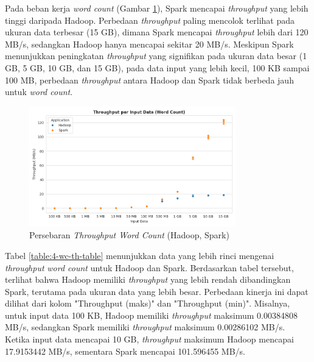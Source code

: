 \newpage
Pada beban kerja \textit{word count} (Gambar \ref{fig:throughput-wordcount}), Spark mencapai \textit{throughput} yang lebih tinggi daripada Hadoop. Perbedaan \textit{throughput} paling mencolok terlihat pada ukuran data terbesar (15 GB), dimana Spark mencapai \textit{throughput} lebih dari 120 MB/s, sedangkan Hadoop hanya mencapai sekitar 20 MB/s. Meskipun Spark menunjukkan peningkatan \textit{throughput} yang signifikan pada ukuran data besar (1 GB, 5 GB, 10 GB, dan 15 GB), pada data input yang lebih kecil, 100 KB sampai 100 MB, perbedaan \textit{throughput} antara Hadoop dan Spark tidak berbeda jauh untuk \textit{word count}.

\begin{figure}[h]
    \centering
    \includegraphics[width=0.8\textwidth]{figures/ch04/1-throughput-wordcount.png}
    \caption{Persebaran \textit{Throughput Word Count} (Hadoop, Spark)}
    \label{fig:throughput-wordcount}
\end{figure}


Tabel \ref{table:4-wc-th-table} menunjukkan data yang lebih rinci mengenai \textit{throughput} \textit{word count} untuk Hadoop dan Spark. Berdasarkan tabel tersebut, terlihat bahwa Hadoop memiliki \textit{throughput} yang lebih rendah dibandingkan Spark, terutama pada ukuran data yang lebih besar.
Perbedaan kinerja ini dapat dilihat dari kolom "Throughput (maks)" dan "Throughput (min)". Misalnya, untuk input data 100 KB, Hadoop memiliki \textit{throughput} maksimum 0.00384808 MB/s, sedangkan Spark memiliki \textit{throughput} maksimum 0.00286102 MB/s. Ketika input data mencapai 10 GB, \textit{throughput} maksimum Hadoop mencapai 17.9153442 MB/s, sementara Spark mencapai 101.596455 MB/s.

